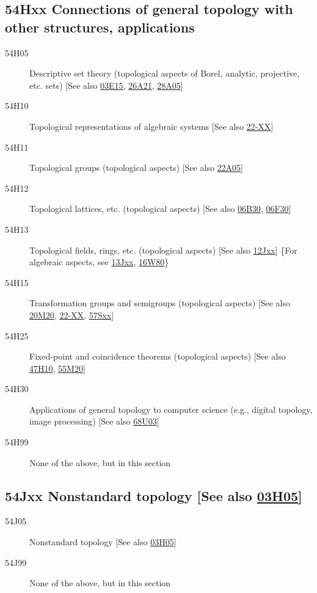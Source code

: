 \subsection*{54Hxx  Connections of general topology with other structures, applications }\label{54Hxx}
\begin{description}  
\item [54H05]\label{54H05} Descriptive set theory (topological aspects of Borel, analytic, projective, etc. sets) [See also \hyperref[03E15]{03E15}, \hyperref[26A21]{26A21}, \hyperref[28A05]{28A05}]
\item [54H10]\label{54H10} Topological representations of algebraic systems [See also \hyperref[22-XX]{22-XX}]
\item [54H11]\label{54H11} Topological groups (topological aspects) [See also \hyperref[22A05]{22A05}]
\item [54H12]\label{54H12} Topological lattices, etc. (topological aspects) [See also \hyperref[06B30]{06B30}, \hyperref[06F30]{06F30}]
\item [54H13]\label{54H13} Topological fields, rings, etc. (topological aspects) [See also \hyperref[12Jxx]{12Jxx}] \{For algebraic aspects, see \hyperref[13Jxx]{13Jxx}, \hyperref[16W80]{16W80}\}
\item [54H15]\label{54H15} Transformation groups and semigroups (topological aspects) [See also \hyperref[20M20]{20M20}, \hyperref[22-XX]{22-XX}, \hyperref[57Sxx]{57Sxx}]
\item [54H25]\label{54H25} Fixed-point and coincidence theorems (topological aspects) [See also \hyperref[47H10]{47H10}, \hyperref[55M20]{55M20}]
\item [54H30]\label{54H30} Applications of general topology to computer science (e.g., digital topology, image processing) [See also \hyperref[68U03]{68U03}]
\item [54H99]\label{54H99} None of the above, but in this section
\end{description}
\subsection*{54Jxx  Nonstandard topology [See also \hyperref[03H05]{03H05}] }\label{54Jxx}
\begin{description}
\item [54J05]\label{54J05} Nonstandard topology [See also \hyperref[03H05]{03H05}]
\item [54J99]\label{54J99} None of the above, but in this section
\end{description}

